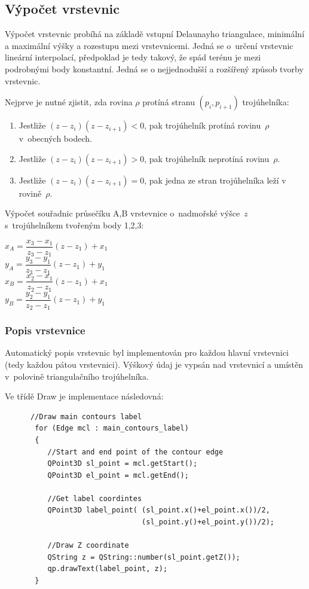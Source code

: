 \documentclass[a4paper, 12pt, oneside, titlepage]{article} %
\begin{document}
\subsection{Výpočet vrstevnic}
Výpočet vrstevnic probíhá na základě vstupní Delaunayho triangulace, minimální a maximální výšky a rozestupu mezi vrstevnicemi. Jedná se o~určení vrstevnic lineární interpolací, předpoklad je tedy takový, že spád terénu je mezi podrobnými body konstantní. Jedná se o nejjednodušší a rozšířený způsob tvorby vrstevnic.

Nejprve je nutné zjistit, zda rovina $\rho$ protíná stranu $(p_i,p_{i+1})$ trojúhelníka:
\begin{enumerate}
\item Jestliže $(z-z_i)(z-z_{i+1})<0$, pak trojúhelník protíná rovinu~$\rho$ v~obecných bodech.
\item Jestliže $(z-z_i)(z-z_{i+1})>0$, pak trojúhelník neprotíná rovinu~$\rho$.
\item Jestliže $(z-z_i)(z-z_{i+1})=0$, pak jedna ze stran trojúhelníka leží v rovině~$\rho$.
\end{enumerate}

Výpočet souřadnic průsečíku A,B vrstevnice o~nadmořské výšce~$z$ s~trojúhelníkem tvořeným body 1,2,3:

\begin{center}
$x_A=\dfrac{x_3-x_1}{z_3-z_1}(z-z_1)+x_1$\\
$y_A=\dfrac{y_3-y_1}{z_3-z_1}(z-z_1)+y_1$\\
$x_B=\dfrac{x_2-x_1}{z_2-z_1}(z-z_1)+x_1$\\
$y_B=\dfrac{y_2-y_1}{z_2-z_1}(z-z_1)+y_1$\\
\end{center}

\subsubsection{Popis vrstevnice}\label{popis_vrs}
Automatický popis vrstevnic byl implementován pro každou hlavní vrstevnici (tedy každou pátou vrstevnici). Výškový údaj je vypsán nad vrstevnicí a umístěn v~polovině triangulačního trojúhelníka. 

Ve třídě Draw je implementace následovná:

\begin{verbatim}
      //Draw main contours label
       for (Edge mcl : main_contours_label)
       {
          //Start and end point of the contour edge
          QPoint3D sl_point = mcl.getStart();
          QPoint3D el_point = mcl.getEnd();

          //Get label coordintes
          QPoint3D label_point( (sl_point.x()+el_point.x())/2, 
                                (sl_point.y()+el_point.y())/2);

          //Draw Z coordinate
          QString z = QString::number(sl_point.getZ());
          qp.drawText(label_point, z);
       }
\end{verbatim}
\end{document}
